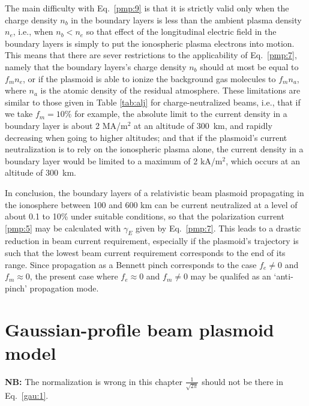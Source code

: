 \documentclass [12pt,a4paper,     ]{report} %
\begin{document}
   The main difficulty with Eq.~\eqref{pmp:9} is that it is strictly valid only when the charge density $n_b$ in the boundary layers is less than the ambient plasma density $n_e$, i.e., when $n_b < n_e$ so that effect of the longitudinal electric field in the boundary layers is simply to put the ionospheric plasma electrons into motion.  This means that there are sever restrictions to the applicability of Eq.~\eqref{pmp:7}, namely that the boundary layers's charge density $n_b$ should at most be equal to $f_m n_e$, or if the plasmoid is able to ionize the background gas molecules to $f_m n_a$, where $n_a$ is the atomic density of the  residual atmosphere.  These limitations are similar to those given in Table \ref{tab:alj} for charge-neutralized beams, i.e., that if we take $f_m =10\%$ for example, the absolute limit to the current density in a boundary layer is about 2 MA/m$^2$ at an altitude of 300~km, and rapidly decreasing when going to higher altitudes; and that if the plasmoid's current neutralization is to rely on the ionospheric plasma alone, the current density in a boundary layer would be limited to a maximum of 2 kA/m$^2$, which occurs at an altitude of 300~km.
 
    In conclusion, the boundary layers of a relativistic beam plasmoid propagating in the ionosphere between 100 and 600 km can be current neutralized at a level of about 0.1 to 10\% under suitable conditions, so that the polarization current \eqref{pmp:5} may be calculated with $\gamma_E$ given by Eq.~\eqref{pmp:7}.  This leads to a drastic reduction in beam current requirement, especially if the plasmoid's trajectory is such that the lowest beam current requirement corresponds to the end of its range.  Since propagation as a Bennett pinch corresponds to the case $f_e \neq 0$ and $f_m \approx 0$, the present case where $f_e \approx 0$ and $f_m \neq 0$ may be qualifed as an `anti-pinch' propagation mode.
 


\section{Gaussian-profile beam plasmoid model}
\label{gau:0}

{\bf NB:}  The normalization is wrong in this chapter $\frac{1}{\sqrt{2\pi}}$ should not be there in Eq.~\eqref{gau:1}. 
\end{document}
